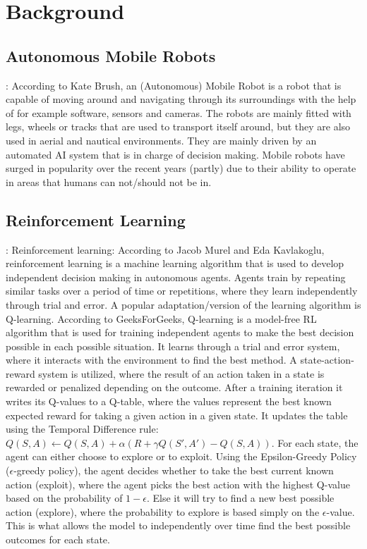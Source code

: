 \section{Background}

\subsection{Autonomous Mobile Robots}:
According to Kate Brush\cite{KateBrush1Robots}, an (Autonomous) Mobile
Robot is a robot that is capable of moving around and navigating through its
surroundings with the help of for example software, sensors and cameras. The robots
are mainly fitted with legs, wheels or tracks that are used to transport itself around, but
they are also used in aerial and nautical environments. They are mainly driven by an
automated AI system that is in charge of decision making. Mobile robots have surged in
popularity over the recent years (partly) due to their ability to operate in areas that
humans can not/should not be in.


\subsection{Reinforcement Learning}:
Reinforcement learning: According to Jacob Murel and Eda Kavlakoglu\cite{JacobMurel1RL}, reinforcement learning is a machine learning
algorithm that is used to develop independent decision making in autonomous agents.
Agents train by repeating similar tasks over a period of time or repetitions, where they
learn independently through trial and error. A popular adaptation/version of the learning
algorithm is Q-learning. According to GeeksForGeeks\cite{GeeksForGeeks1RL}, Q-learning is a model-free RL
algorithm that is used for training independent agents to make the best decision
possible in each possible situation. It learns through a trial and error system, where it
interacts with the environment to find the best method. A state-action-reward system is
utilized, where the result of an action taken in a state is rewarded or penalized
depending on the outcome. After a training iteration it writes its Q-values to a Q-table,
where the values represent the best known expected reward for taking a given action in
a given state. It updates the table using the Temporal Difference rule:
\(Q(S, A) \leftarrow Q(S, A) + \alpha \left( R + \gamma Q(S', A') - Q(S, A) \right)\). For each state, the agent can either choose to
explore or to exploit. Using the Epsilon-Greedy Policy (\(\epsilon\)-greedy policy), the agent
decides whether to take the best current known action (exploit), where the agent picks
the best action with the highest Q-value based on the probability of \(1-\epsilon\). Else it will try to
find a new best possible action (explore), where the probability to explore is based
simply on the \(\epsilon\)-value. This is what allows the model to independently over time find the
best possible outcomes for each state.

